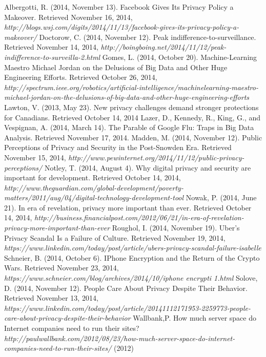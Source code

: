 \documentclass[12pt]{article}
\begin{document}
\clearpage
\begin{thebibliography}{99}
	Albergotti, R. (2014, November 13). Facebook Gives Its Privacy Policy a Makeover. Retrieved November 16, 2014, {\sl http://blogs.wsj.com/digits/2014/11/13/facebook-gives-its-privacy-policy-a-makeover/}
	Doctorow, C. (2014, November 12). Peak indifference-to-surveillance. Retrieved November 14, 2014, {\sl http://boingboing.net/2014/11/12/peak-indifference-to-surveilla-2.html}
	Gomes, L. (2014, October 20). Machine-Learning Maestro Michael Jordan on the Delusions of Big Data and Other Huge Engineering Efforts. Retrieved October 26, 2014, {\sl http://spectrum.ieee.org/robotics/artificial-intelligence/machinelearning-maestro-michael-jordan-on-the-delusions-of-big-data-and-other-huge-engineering-efforts}
	Lawton, V. (2013, May 23). New privacy challenges demand stronger protections for Canadians. Retrieved October 14, 2014
	Lazer, D., Kennedy, R., King, G., and Vespignan, A. (2014, March 14). The Parable of Google Flu: Traps in Big Data Analysis. Retrieved November 17, 2014.
	Madden, M. (2014, November 12). Public Perceptions of Privacy and Security in the Post-Snowden Era. Retrieved November 15, 2014, {\sl http://www.pewinternet.org/2014/11/12/public-privacy-perceptions/}
	Notley, T. (2014, August 4). Why digital privacy and security are important for development. Retrieved October 14, 2014, {\sl http://www.theguardian.com/global-development/poverty-matters/2011/aug/04/digital-technology-development-tool}
	Nowak, P. (2014, June 21). In era of revelation, privacy more important than ever. Retrieved October 14, 2014, {\sl http://business.financialpost.com/2012/06/21/in-era-of-revelation-privacy-more-important-than-ever}
	Roughol, I. (2014, November 19). Uber's Privacy Scandal Is a Failure of Culture. Retrieved November 19, 2014, {\sl
	https://www.linkedin.com/today/post/article/ubers-privacy-scandal-failure-isabelle}
	Schneier, B. (2014, October 6). IPhone Encryption and the Return of the Crypto Wars. Retrieved November 23, 2014, {\sl https://www.schneier.com/blog/archives/2014/10/iphone \textunderscore encrypti \textunderscore 1.html}
	Solove, D. (2014, November 12). People Care About Privacy Despite Their Behavior. Retrieved November 13, 2014, {\sl https://www.linkedin.com/today/post/article/20141112171953-2259773-people-care-about-privacy-despite-their-behavior}
	Wallbank,P. How much server space do Internet companies need to run their sites? {\sl http://paulwallbank.com/2012/08/23/how-much-server-space-do-internet-companies-need-to-run-their-sites/} (2012)


\end{thebibliography}
\end{document}
